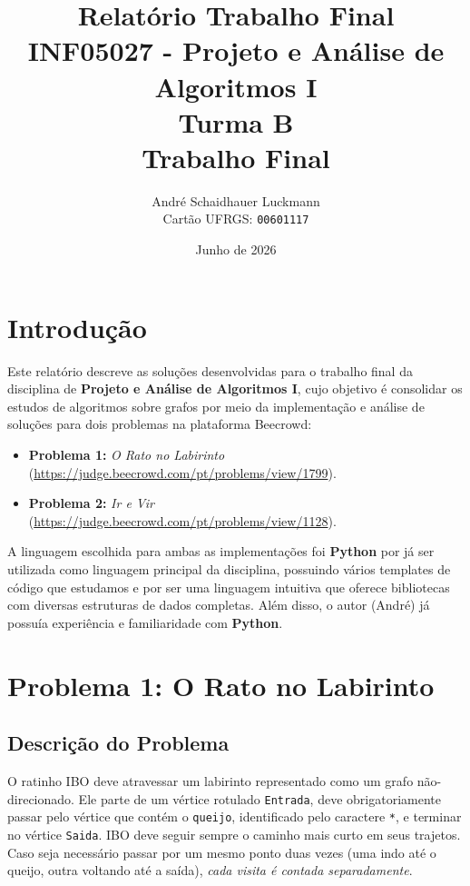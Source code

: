 \documentclass[11pt,a4paper]{article}
\title{Relatório Trabalho Final \\ \large INF05027 - Projeto e Análise de Algoritmos I \\ Turma B \\ Trabalho Final}
\author{André Schaidhauer Luckmann \\ Cartão UFRGS: \texttt{00601117}}
\date{Junho de 2026}
\begin{document}
\maketitle

\vspace{1em}

\tableofcontents

\vspace{2em}

\section{Introdução}

Este relatório descreve as soluções desenvolvidas para o trabalho final da
disciplina de \textbf{Projeto e Análise de Algoritmos I}, cujo
objetivo é consolidar os estudos de algoritmos sobre grafos por meio da
implementação e análise de soluções para dois problemas na plataforma Beecrowd:

\begin{itemize}
    \item \textbf{Problema 1:} \emph{O Rato no Labirinto}
    (\url{https://judge.beecrowd.com/pt/problems/view/1799}).
    \item \textbf{Problema 2:} \emph{Ir e Vir}
    (\url{https://judge.beecrowd.com/pt/problems/view/1128}).
\end{itemize}

A linguagem escolhida para ambas as implementações foi \textbf{Python}
por já ser utilizada como linguagem principal da disciplina, possuindo vários templates de código que estudamos e por ser uma linguagem intuitiva que oferece bibliotecas com diversas estruturas de dados completas. Além disso, o autor (André) já possuía experiência e familiaridade com \textbf{Python}.

\section{Problema 1: O Rato no Labirinto}

\subsection{Descrição do Problema}

O ratinho IBO deve atravessar um
labirinto representado como um grafo não-direcionado. Ele parte de um vértice
rotulado \texttt{Entrada}, deve obrigatoriamente passar pelo vértice que
contém o \texttt{queijo}, identificado pelo caractere \texttt{*}, e
terminar no vértice \texttt{Saida}. IBO deve seguir
sempre o caminho mais curto em seus trajetos. Caso seja necessário passar por um mesmo
ponto duas vezes (uma indo até o queijo, outra voltando até a saída), \emph{cada
visita é contada separadamente}.
\end{document}
